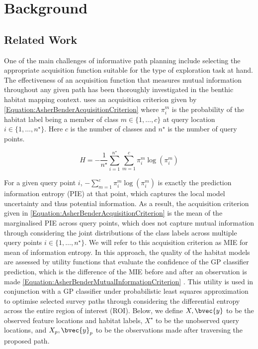 \chapter{Background}
\label{Background}

	\section{Related Work}
	
		One of the main challenges of informative path planning include selecting the appropriate acquisition function suitable for the type of exploration task at hand. The effectiveness of an acquisition function that measures mutual information throughout any given path has been thoroughly investigated in the benthic habitat mapping context. \cite{AsherBender} uses an acquisition criterion given by \eqref{Equation:AsherBenderAcquisitionCriterion} where $\pi^{m}_{i}$ is the probability of the habitat label being a member of class $m \in \{1, \dots, c\}$ at query location $i \in \{1, \dots, n^{\star}\}$. Here $c$ is the number of classes and $n^{\star}$ is the number of query points.
		
		\begin{equation}
			H = - \frac{1}{n^{\star}} \sum_{i = 1}^{n^{\star}} \sum_{m = 1}^{c} \pi^{m}_{i} \log(\pi^{m}_{i})
		\label{Equation:AsherBenderAcquisitionCriterion}
		\end{equation}
		
		For a given query point $i$, $- \sum_{m = 1}^{c} \pi^{m}_{i} \log(\pi^{m}_{i})$ is exactly the prediction information entropy (PIE) at that point, which captures the local model uncertainty and thus potential information. As a result, the acquisition criterion given in \eqref{Equation:AsherBenderAcquisitionCriterion} is the mean of the marginalised PIE across query points, which does not capture mutual information through considering the joint distributions of the class labels across multiple query points $i \in \{1, \dots, n^{\star}\}$. We will refer to this acquisition criterion as MIE for mean of information entropy. In this approach, the quality of the habitat models are assessed by utility functions that evaluate the confidence of the GP classifier prediction, which is the difference of the MIE before and after an observation is made \eqref{Equation:AsherBenderMutualInformationCriterion} \citep{Rigby:ROB20372}. This utility is used in conjunction with a GP classifier under probabilistic least squares approximation to optimise selected survey paths through considering the differential entropy across the entire region of interest (ROI). Below, we define $X, \bvec{y}$ to be the observed feature locations and habitat labels, $X^{\star}$ to be the unobserved query locations, and $X_{p}, \bvec{y}_{p}$ to be the observations made after traversing the proposed path.
	
